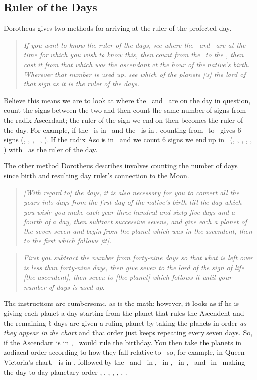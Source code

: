 \subsection{Ruler of the Days}
Dorotheus gives two methods for arriving at the ruler of the profected day.
\begin{quote}
\textsl{
If you want to know the ruler of the days, see where the \Sun\, and \Moon\, are at the time for which you wish to know this, then count from the \Sun\, to the \Moon, then cast it from that which was the ascendant at the hour of the native's birth. Wherever that number is used up, see which of the planets [is] the lord of that sign as it is the ruler of the days.}
\end{quote}

Believe this means we are to look at where the \Sun\, and \Moon\, are on the day in question, count the signs between the two and then count the same number of signs from the radix Ascendant; the ruler of the sign we end on then becomes the ruler of the day. For example, if the \Sun\, is in \Aquarius\, and the \Moon\, is in \Cancer, counting from \Aquarius\, to \Cancer\, gives 6 signs (\Aquarius, \Pisces, \Aries, \Taurus\, \Gemini, \Cancer). If the radix Asc is in \Gemini\, and we count 6 signs we end up in \Sagittarius\,  (\Gemini, \Cancer, \Leo, \Virgo, \Libra, \Sagittarius) with \Jupiter\, as the ruler of the day.

The other method Dorotheus describes involves counting the number of days since birth and resulting day ruler's connection to the Moon.
\begin{quote}
\textsl{[With regard to] the days, it is also necessary for you to convert all the years into days from the first day of the native's birth till the day which you wish; you make each year three hundred and sixty-five days and a fourth of a day, then subtract successive sevens, and give each a planet of the seven seven and begin from the planet which was in the ascendent, then to the first which follows [it].
}
\end{quote}
\begin{quote}
\textsl{First you subtract the number from forty-nine days so that what is left over is less than forty-nine days, then give seven to the lord of the sign of life [the ascendent], then seven to [the planet] which follows it until your number of days is used up.
}
\end{quote}

The instructions are cumbersome, as is the math; however, it looks as if he is giving each planet a day starting from the planet that rules the Ascendent and the remaining 6 days are given a ruling planet by taking the planets in order \textsl{as they appear in the chart} and that order just keeps repeating every seven days. So, if the Ascendant is in \Gemini, \Mercury\, would rule the birthday. You then take the planets in zodiacal order according to how they fall relative to \Mercury\, so, for example, in Queen Victoria's chart, \Mercury\, is in \Taurus, followed by the \Sun\, and \Moon\, in \Gemini, \Jupiter\, in \Aquarius, \Saturn\, in \Pisces, \Mars\, and \Venus\, in \Aries\, making the day to day planetary order \Mercury, \Sun, \Moon, \Jupiter, \Saturn, \Mars, \Venus.

